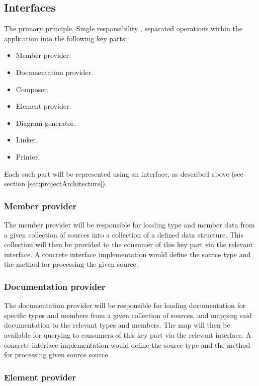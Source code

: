 \subsection{Interfaces} \label{sec:projectComponents}

The primary principle, Single responsibility \cite{hall_adaptive_2017}, separated operations within the application into the following key parts:
\begin{itemize}
    \item Member provider.
    \item Documentation provider.
    \item Composer.
    \item Element provider.
    \item Diagram generator.
    \item Linker.
    \item Printer.
\end{itemize}

Each such part will be represented using an interface, as described above (see section \ref{sec:projectArchitecture}).

\subsubsection{Member provider}

The member provider will be responsible for loading type and member data from a given collection of sources into a collection of a defined data structure.
This collection will then be provided to the consumer of this key part via the relevant interface.
A concrete interface implementation would define the source type and the method for processing the given source.

\subsubsection{Documentation provider}

The documentation provider will be responsible for loading documentation for specific types and members from a given collection of sources, and mapping said documentation to the relevant types and members.
The map will then be available for querying to consumers of this key part via the relevant interface.
A concrete interface implementation would define the source type and the method for processing given source source.

\subsubsection{Element provider} \label{sec:elementProvider}


